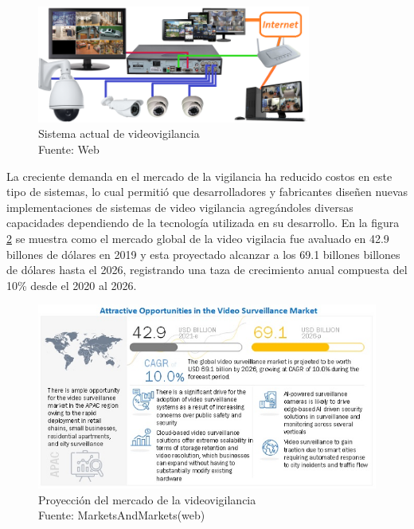 \begin{figure}[H]
    \begin{center}
        \includegraphics[width=9cm]{img/capitulo_2/sis_videovigilancia.png}
    \end{center}
    \caption{Sistema actual de videovigilancia\\Fuente: Web}
    \label{fig:sistema_video_vigilancia}
\end{figure}

La creciente demanda en el mercado de la vigilancia ha reducido costos en este tipo de sistemas, lo cual permitió que desarrolladores y fabricantes diseñen nuevas implementaciones de sistemas de video vigilancia agregándoles diversas capacidades dependiendo de la tecnología utilizada en su desarrollo. En la figura \ref{fig:surveillance-market} se muestra como el mercado global de la video vigilacia fue avaluado en 42.9 billones de dólares en 2019 y esta proyectado alcanzar a los 69.1 billones billones de dólares hasta el 2026, registrando una taza de crecimiento anual compuesta del 10\% desde el 2020 al 2026. \cite{marketsandmarkets:market-surveillance}\\

\begin{figure}[H]
    \begin{center}
        \includegraphics[width=13cm]{img/capitulo_2/surveillance-market.jpg}
    \end{center}
    \caption{Proyección del mercado de la videovigilancia\\Fuente: MarketsAndMarkets(web)}
    \label{fig:surveillance-market}
\end{figure}

